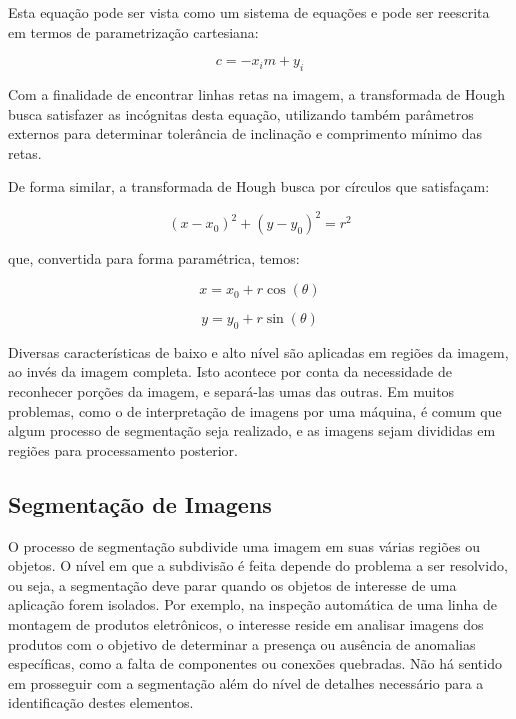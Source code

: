 Esta equação pode ser vista como um sistema de equações e pode ser reescrita em termos de parametrização cartesiana:

\begin{equation}
	\displaystyle c = -x_im + y_i
\end{equation}

Com a finalidade de encontrar linhas retas na imagem, a transformada de Hough busca satisfazer as incógnitas desta equação, utilizando também parâmetros externos para determinar tolerância de inclinação e comprimento mínimo das retas.

De forma similar, a transformada de Hough busca por círculos que satisfaçam:

\begin{equation}
	\displaystyle (x-x_0)^2 + (y-y_0)^2 = r^2
\end{equation}

que, convertida para forma paramétrica, temos:


\begin{equation}
	\displaystyle x = x_0 +r \cos(\theta)
\end{equation}

\begin{equation}
	\displaystyle y = y_0 +r \sin(\theta)
\end{equation}


Diversas características de baixo e alto nível são aplicadas em regiões da imagem, ao invés da imagem completa. Isto acontece por conta da necessidade de reconhecer porções da imagem, e separá-las umas das outras. Em muitos problemas, como o de interpretação de imagens por uma máquina, é comum que algum processo de segmentação seja realizado, e as imagens sejam divididas em regiões para processamento posterior.

\subsection{Segmentação de Imagens}

O processo de segmentação subdivide uma imagem em suas várias regiões ou objetos. O nível em que a subdivisão é feita depende do problema a ser resolvido, ou seja, a segmentação deve parar quando os objetos de interesse de uma aplicação forem isolados. Por exemplo, na inspeção automática de uma linha de montagem de produtos eletrônicos, o interesse reside em analisar imagens dos produtos com o objetivo de determinar a presença ou ausência de anomalias específicas, como a falta de componentes ou conexões quebradas. Não há sentido em prosseguir com a segmentação além do nível de detalhes necessário para a identificação destes elementos.

